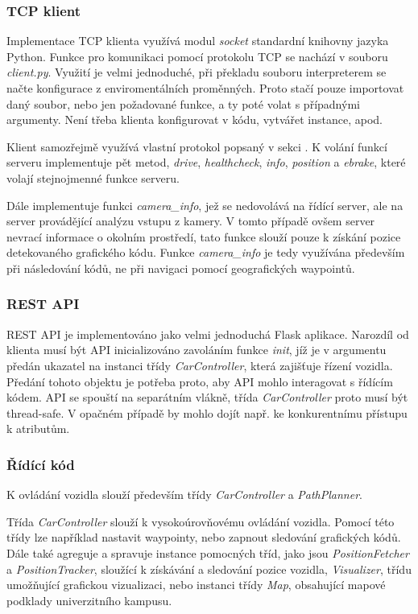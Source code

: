 \documentclass[czech,bachelor,dept460,male,cpp,cpdeclaration]{diploma}
\begin{document}
\subsubsection{TCP klient}

Implementace TCP klienta využívá modul \emph{socket} standardní knihovny jazyka Python. Funkce pro komunikaci pomocí protokolu TCP
se nachází v souboru \emph{client.py}. Využití je velmi jednoduché, při překladu souboru interpreterem se načte konfigurace 
z enviromentálních proměnných. Proto stačí pouze importovat daný soubor, nebo jen požadované funkce, a ty poté volat s případnými
argumenty. Není třeba klienta konfigurovat v kódu, vytvářet instance, apod. 

Klient samozřejmě využívá vlastní protokol popsaný v sekci . K volání funkcí serveru implementuje pět
metod, \emph{drive}, \emph{healthcheck}, \emph{info}, \emph{position} a \emph{ebrake}, které volají stejnojmenné funkce serveru.

Dále implementuje funkci \emph{camera\_info}, jež se nedovolává na řídící server, ale na server provádějící analýzu vstupu 
z kamery. V tomto případě ovšem server nevrací informace o okolním prostředí, tato funkce slouží pouze k získání pozice 
detekovaného grafického kódu. Funkce \emph{camera\_info} je tedy využívána především při následování kódů, ne při navigaci pomocí
geografických waypointů.

\subsubsection{REST API}

REST API je implementováno jako velmi jednoduchá Flask aplikace. Narozdíl od klienta musí být API inicializováno zavoláním funkce
\emph{init}, jíž je v argumentu předán ukazatel na instanci třídy \emph{CarController}, která zajišťuje řízení vozidla. Předání
tohoto objektu je potřeba proto, aby API mohlo interagovat s řídícím kódem. API se spouští na separátním vlákně, třída 
\emph{CarController} proto musí být thread-safe. V opačném případě by mohlo dojít např. ke konkurentnímu přístupu k atributům.

\subsubsection{Řídící kód}

K ovládání vozidla slouží především třídy \emph{CarController} a \emph{PathPlanner}.

Třída \emph{CarController} slouží k vysokoúrovňovému ovládání vozidla. Pomocí této třídy lze například nastavit waypointy, nebo
zapnout sledování grafických kódů. Dále také agreguje a spravuje instance pomocných tříd, jako jsou \emph{PositionFetcher} 
a \emph{PositionTracker}, sloužící k získávání a sledování pozice vozidla, \emph{Visualizer}, třídu umožňující grafickou 
vizualizaci, nebo instanci třídy \emph{Map}, obsahující mapové podklady univerzitního kampusu.
\end{document}
